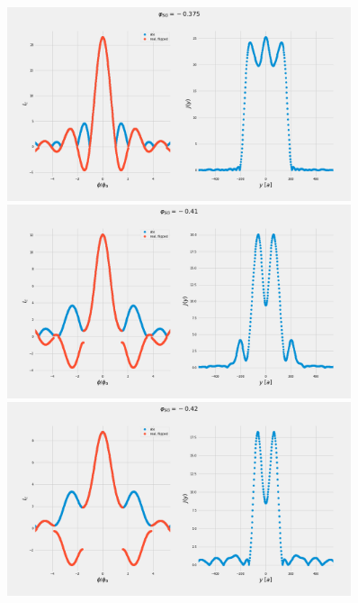 \documentclass[a4paper]{article}
\begin{document}
\begin{figure}
	\includegraphics[width=0.9\textwidth]{figs/wg32double/current_and_density_0375}
	\includegraphics[width=0.9\textwidth]{figs/wg32double/current_and_density_041}
	\includegraphics[width=0.9\textwidth]{figs/wg32double/current_and_density_042}
	
\end{figure}
\end{document}
